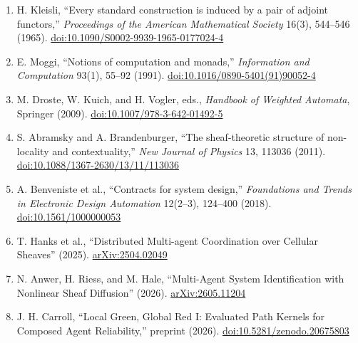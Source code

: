 \documentclass[
  11pt,
]{article}
\providecommand{\tightlist}{%
  \setlength{\itemsep}{0pt}\setlength{\parskip}{0pt}}
\theoremstyle{plain}
\theoremstyle{definition}\newtheorem{definition}[theorem]{Definition}
\theoremstyle{remark}\newtheorem*{remark}{Remark}
\begin{document}
\begin{enumerate}
\def\labelenumi{\arabic{enumi}.}
\tightlist
\item
  H. Kleisli, ``Every standard construction is induced by a pair of adjoint
  functors,'' \emph{Proceedings of the American Mathematical Society} 16(3),
  544--546 (1965).
  \href{https://doi.org/10.1090/S0002-9939-1965-0177024-4}{doi:10.1090/S0002-9939-1965-0177024-4}
\item
  E. Moggi, ``Notions of computation and monads,'' \emph{Information and
  Computation} 93(1), 55--92 (1991).
  \href{https://doi.org/10.1016/0890-5401(91)90052-4}{doi:10.1016/0890-5401(91)90052-4}
\item
  M. Droste, W. Kuich, and H. Vogler, eds., \emph{Handbook of Weighted
  Automata}, Springer (2009).
  \href{https://doi.org/10.1007/978-3-642-01492-5}{doi:10.1007/978-3-642-01492-5}
\item
  S. Abramsky and A. Brandenburger, ``The sheaf-theoretic structure of
  non-locality and contextuality,'' \emph{New Journal of Physics} 13, 113036
  (2011). \href{https://doi.org/10.1088/1367-2630/13/11/113036}{doi:10.1088/1367-2630/13/11/113036}
\item
  A. Benveniste et al., ``Contracts for system design,'' \emph{Foundations and
  Trends in Electronic Design Automation} 12(2--3), 124--400 (2018).
  \href{https://doi.org/10.1561/1000000053}{doi:10.1561/1000000053}
\item
  T. Hanks et al., ``Distributed Multi-agent Coordination over Cellular
  Sheaves'' (2025). \href{https://arxiv.org/abs/2504.02049}{arXiv:2504.02049}
\item
  N. Anwer, H. Riess, and M. Hale, ``Multi-Agent System Identification with
  Nonlinear Sheaf Diffusion'' (2026). \href{https://arxiv.org/abs/2605.11204}{arXiv:2605.11204}
\item
  J. H. Carroll, ``Local Green, Global Red I: Evaluated Path Kernels for
  Composed Agent Reliability,'' preprint (2026).
  \href{https://doi.org/10.5281/zenodo.20675803}{doi:10.5281/zenodo.20675803}
\end{enumerate}
\end{document}
